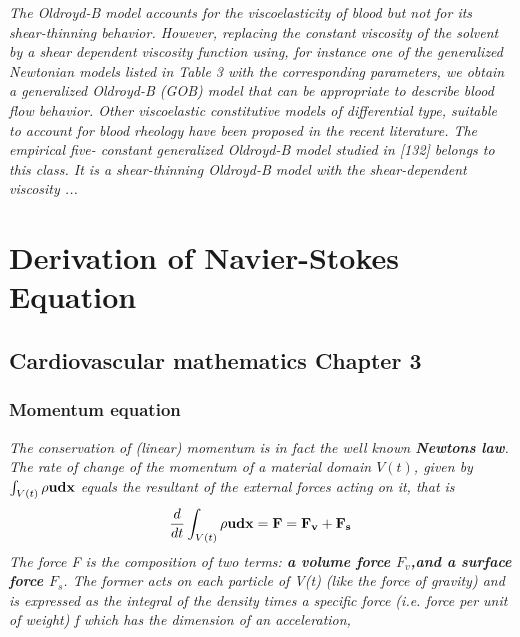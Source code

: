 \documentclass[11pt,letterpaper]{article}
\begin{document}
\textit{
 The Oldroyd-B model accounts for the viscoelasticity of blood but not for its shear-thinning behavior.  However, replacing the constant viscosity of the solvent by a shear dependent viscosity function 
using, for instance one of the generalized Newtonian models listed in Table 3 with
the corresponding parameters, we obtain a generalized Oldroyd-B (GOB) model
that can be appropriate to describe blood flow behavior.
Other viscoelastic constitutive models of differential type, suitable to account for blood rheology have been proposed in the recent literature. The empirical five-
constant generalized Oldroyd-B model studied in [132] belongs to this class. It is a shear-thinning Oldroyd-B model with the shear-dependent viscosity ...}









\newpage
\section{Derivation of Navier-Stokes Equation}


\subsection{Cardiovascular mathematics Chapter 3}

\subsubsection*{Momentum equation}
\textit{The conservation of (linear) momentum is in fact the well known \textbf{Newtons law}. The rate of change of the momentum of a material domain $V(t)$, given by $\int_{V(t)} \rho \bf{u} d\bf{x} $ equals the resultant of the external forces acting on it, that is \begin{equation}
   \frac{d}{dt} \int_{V(t)} \rho \bf{u} d\bf{x} = \bm{F} = \bm{F_v} + \bm{F_s}
\end{equation}
The force F is the composition of two terms:\textbf{ a volume force $F_v$,and a surface force $F_s$}. The former acts on each particle of V(t) (like the force of gravity) and is expressed as the integral of the density times a specific force (i.e. force per unit of weight) f which has the dimension of an acceleration,}
\end{document}
